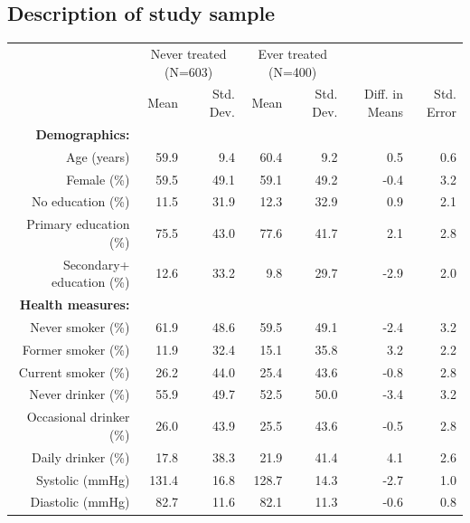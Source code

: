 \documentclass[
  letterpaper,
  DIV=11,
  numbers=noendperiod]{scrartcl}
\makeatletter
\renewenvironment{table}%
  {\renewcommand\familydefault\sfdefault
   \@float{table}}
  {\end@float}
\makeatother
\begin{document}
\hypertarget{description-of-study-sample}{%
\subsection{Description of study
sample}\label{description-of-study-sample}}

\hypertarget{tbl-table1}{}
\begin{table}
\caption{\label{tbl-table1}Descriptive statistics for selected demographic, health, and
environmental measures at baseline, by treatment status }\tabularnewline

\centering\centering
\fontsize{9}{11}\selectfont
\begin{tabular}[t]{rrrrrrr}
\toprule
\multicolumn{1}{c}{ } & \multicolumn{2}{c}{Never treated (N=603)} & \multicolumn{2}{c}{Ever treated (N=400)} & \multicolumn{2}{c}{ } \\
\cmidrule(l{3pt}r{3pt}){2-3} \cmidrule(l{3pt}r{3pt}){4-5}
  & Mean & Std. Dev. & Mean & Std. Dev. & Diff. in Means & Std. Error\\
\midrule
\textbf{Demographics:} & \textbf{} & \textbf{} & \textbf{} & \textbf{} & \textbf{} & \textbf{}\\
Age (years) & 59.9 & 9.4 & 60.4 & 9.2 & 0.5 & 0.6\\
Female (\%) & 59.5 & 49.1 & 59.1 & 49.2 & -0.4 & 3.2\\
No education (\%) & 11.5 & 31.9 & 12.3 & 32.9 & 0.9 & 2.1\\
Primary education (\%) & 75.5 & 43.0 & 77.6 & 41.7 & 2.1 & 2.8\\
Secondary+ education (\%) & 12.6 & 33.2 & 9.8 & 29.7 & -2.9 & 2.0\\
\textbf{Health measures:} & \textbf{} & \textbf{} & \textbf{} & \textbf{} & \textbf{} & \textbf{}\\
Never smoker (\%) & 61.9 & 48.6 & 59.5 & 49.1 & -2.4 & 3.2\\
Former smoker (\%) & 11.9 & 32.4 & 15.1 & 35.8 & 3.2 & 2.2\\
Current smoker (\%) & 26.2 & 44.0 & 25.4 & 43.6 & -0.8 & 2.8\\
Never drinker (\%) & 55.9 & 49.7 & 52.5 & 50.0 & -3.4 & 3.2\\
Occasional drinker (\%) & 26.0 & 43.9 & 25.5 & 43.6 & -0.5 & 2.8\\
Daily drinker (\%) & 17.8 & 38.3 & 21.9 & 41.4 & 4.1 & 2.6\\
Systolic (mmHg) & 131.4 & 16.8 & 128.7 & 14.3 & -2.7 & 1.0\\
Diastolic (mmHg) & 82.7 & 11.6 & 82.1 & 11.3 & -0.6 & 0.8\\

\end{tabular}
\end{table}
\end{document}
